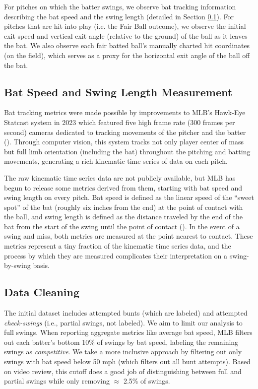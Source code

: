 \documentclass{article}
\begin{document}
    For pitches on which the batter swings, we observe bat tracking information describing the bat speed and the swing length (detailed in Section \ref{sec:measurement}). For pitches that are hit into play (i.e. the Fair Ball outcome), we observe the initial exit speed and vertical exit angle (relative to the ground) of the ball as it leaves the bat. We also observe each fair batted ball's manually charted hit coordinates (on the field), which serves as a proxy for the horizontal exit angle of the ball off the bat.

    \subsection{Bat Speed and Swing Length Measurement}
    \label{sec:measurement}

      Bat tracking metrics were made possible by improvements to MLB's Hawk-Eye Statcast system in 2023 which featured five high frame rate (300 frames per second) cameras dedicated to tracking movements of the pitcher and the batter (\cite{goldbeck_introducing_2023}). Through computer vision, this system tracks not only player center of mass but full limb orientation (including the bat) throughout the pitching and batting movements, generating a rich kinematic time series of data on each pitch.

      The raw kinematic time series data are not publicly available, but MLB has begun to release some metrics derived from them, starting with bat speed and swing length on every pitch. Bat speed is defined as the linear speed of the ``sweet spot'' of the bat (roughly six inches from the end) at the point of contact with the ball, and swing length is defined as the distance traveled by the end of the bat from the start of the swing until the point of contact (\cite{petriello_everything_2024}). In the event of a swing and miss, both metrics are measured at the point nearest to contact. These metrics represent a tiny fraction of the kinematic time series data, and the process by which they are measured complicates their interpretation on a swing-by-swing basis.

    \subsection{Data Cleaning}

    The initial dataset includes attempted bunts (which are labeled) and attempted {\it check-swings} (i.e., partial swings, not labeled). We aim to limit our analysis to full swings. When reporting aggregate metrics like average bat speed, MLB filters out each batter's bottom 10\% of swings by bat speed, labeling the remaining swings as {\it competitive}. We take a more inclusive approach by filtering out only swings with bat speed below 50 mph (which filters out all bunt attempts). Based on video review, this cutoff does a good job of distinguishing between full and partial swings while only removing $\approx$ 2.5\% of swings.
\end{document}

